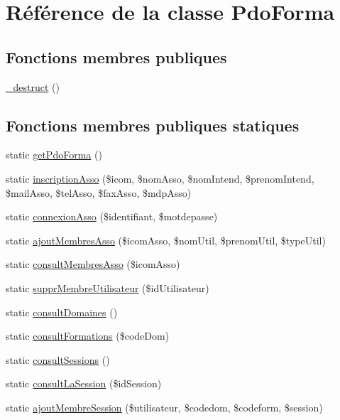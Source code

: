\hypertarget{class_pdo_forma}{}\section{Référence de la classe Pdo\+Forma}
\label{class_pdo_forma}
\subsection*{Fonctions membres publiques}
\begin{DoxyCompactItemize}
\item 
\hyperlink{class_pdo_forma_a1c6024f681d3956654622d9f28e540a2}{\+\_\+destruct} ()
\end{DoxyCompactItemize}
\subsection*{Fonctions membres publiques statiques}
\begin{DoxyCompactItemize}
\item 
static \hyperlink{class_pdo_forma_a601381ed4cb812a64d3ce4ea2afda54c}{get\+Pdo\+Forma} ()
\item 
static \hyperlink{class_pdo_forma_a0055e16568d6f583c27d78942cbb6149}{inscription\+Asso} (\$icom, \$nom\+Asso, \$nom\+Intend, \$prenom\+Intend, \$mail\+Asso, \$tel\+Asso, \$fax\+Asso, \$mdp\+Asso)
\item 
static \hyperlink{class_pdo_forma_a8d1c2949e653ed53bd49bffe77836c34}{connexion\+Asso} (\$identifiant, \$motdepasse)
\item 
static \hyperlink{class_pdo_forma_a3e93ce87ef2f5471efa2681b9a4017e8}{ajout\+Membres\+Asso} (\$icom\+Asso, \$nom\+Util, \$prenom\+Util, \$type\+Util)
\item 
static \hyperlink{class_pdo_forma_a1ed6a3ae06e68ca5841cadbe2a1ada4d}{consult\+Membres\+Asso} (\$icom\+Asso)
\item 
static \hyperlink{class_pdo_forma_a6b0368c6ed04e1f232c16f2ffb728682}{suppr\+Membre\+Utilisateur} (\$id\+Utilisateur)
\item 
static \hyperlink{class_pdo_forma_ab0ba792e63b05b25d4008cfc0249cc32}{consult\+Domaines} ()
\item 
static \hyperlink{class_pdo_forma_a8d2afe1b1a15c9873025e9ed5e341a49}{consult\+Formations} (\$code\+Dom)
\item 
static \hyperlink{class_pdo_forma_adae951900094053772ea21c05ae629b8}{consult\+Sessions} ()
\item 
static \hyperlink{class_pdo_forma_add37d6d8cd9e0b54f60bc5bfb9faa4c9}{consult\+La\+Session} (\$id\+Session)
\item 
static \hyperlink{class_pdo_forma_a36c9d6b8d10a8596f03c1cd78307b044}{ajout\+Membre\+Session} (\$utilisateur, \$codedom, \$codeform, \$session)
\end{DoxyCompactItemize}


